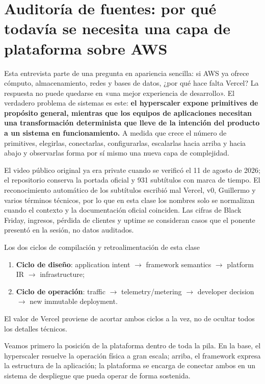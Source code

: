 \section{Auditoría de fuentes: por qué todavía se necesita una capa de plataforma sobre AWS}

Esta entrevista parte de una pregunta en apariencia sencilla: si AWS ya ofrece cómputo, almacenamiento, redes y bases de datos, ¿por qué hace falta Vercel? La respuesta no puede quedarse en «una mejor experiencia de desarrollo». El verdadero problema de sistemas es este: \textbf{el hyperscaler expone primitives de propósito general, mientras que los equipos de aplicaciones necesitan una transformación determinista que lleve de la intención del producto a un sistema en funcionamiento.} A medida que crece el número de primitives, elegirlas, conectarlas, configurarlas, escalarlas hacia arriba y hacia abajo y observarlas forma por sí mismo una nueva capa de complejidad.

El video público original ya era private cuando se verificó el 11 de agosto de 2026; el repositorio conserva la portada oficial y 931 subtítulos con marca de tiempo. El reconocimiento automático de los subtítulos escribió mal Vercel, v0, Guillermo y varios términos técnicos, por lo que en esta clase los nombres solo se normalizan cuando el contexto y la documentación oficial coinciden. Las cifras de Black Friday, ingresos, pérdida de clientes y uptime se consideran casos que el ponente presentó en la sesión, no datos auditados.

\begin{importantbox}{Los dos ciclos de compilación y retroalimentación de esta clase}
\begin{enumerate}
  \item \textbf{Ciclo de diseño}: application intent $\rightarrow$ framework semantics $\rightarrow$ platform IR $\rightarrow$ infrastructure;
  \item \textbf{Ciclo de operación}: traffic $\rightarrow$ telemetry/metering $\rightarrow$ developer decision $\rightarrow$ new immutable deployment.
\end{enumerate}
El valor de Vercel proviene de acortar ambos ciclos a la vez, no de ocultar todos los detalles técnicos.
\end{importantbox}

Veamos primero la posición de la plataforma dentro de toda la pila. En la base, el hyperscaler resuelve la operación física a gran escala; arriba, el framework expresa la estructura de la aplicación; la plataforma se encarga de conectar ambos en un sistema de despliegue que pueda operar de forma sostenida.

